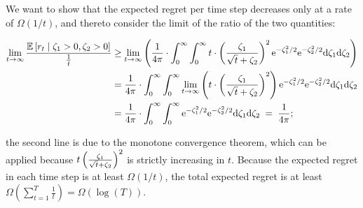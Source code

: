 We want to show that the expected regret per time step decreases only
at a rate of $\Omega(1/t)$, and thereto consider the limit of the
ratio of the two quantities:

\begin{align*}
\lim_{t \to \infty} \frac{\ExpectC{\Regret{t}}{\Noise{1} > 0, \Noise{2} > 0}}{\frac{1}{t}}
  & \geq
    \lim_{t \to \infty} \left( \frac{1}{4\pi} \cdot
    \int_{0}^{\infty} \int_{0}^{\infty}
    t \cdot \left( \frac{\Noise{1}}{\sqrt{t}+\Noise{2}} \right)^2
    \e^{-\Noise{1}^2/2} \e^{-\Noise{2}^2/2} \dd \Noise{1} \dd \Noise{2} \right) \\
  & = \frac{1}{4\pi} \cdot \int_{0}^{\infty} \int_{0}^{\infty}
    \lim_{t \to \infty}
    \left( t \cdot \left( \frac{\Noise{1}}{\sqrt{t}+\Noise{2}} \right)^2 \right)
    \e^{-\Noise{1}^2/2} \e^{-\Noise{2}^2/2} \dd \Noise{1} \dd \Noise{2} \\
  & = \frac{1}{4\pi} \cdot \int_{0}^{\infty} \int_{0}^{\infty}
    \e^{-\Noise{1}^2/2} \e^{-\Noise{2}^2/2} \dd \Noise{1} \dd \Noise{2}
  \; = \; \frac{1}{4 \pi}; 
\end{align*}

the second line is due to the monotone convergence theorem,
which can be applied because
$t \left(\frac{\Noise{1}}{\sqrt{t}+\Noise{2}}\right)^2$
is strictly increasing in $t$.
Because the expected regret in each time step is at least
$\Omega(1/t)$, the total expected regret is at least
$\Omega(\sum_{t=1}^{T}\frac{1}{t}) = \Omega(\log(T))$.
